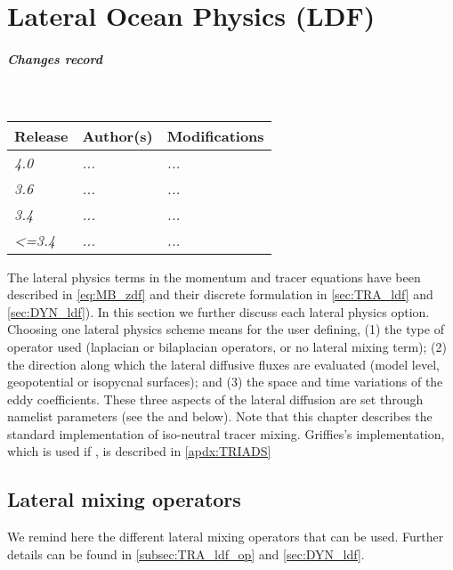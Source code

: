\documentclass[../main/NEMO_manual]{subfiles}
\begin{document}
\chapter{Lateral Ocean Physics (LDF)}
\label{chap:LDF}

\thispagestyle{plain}

\chaptertoc

\paragraph{Changes record} ~\\

{\footnotesize
  \begin{tabularx}{\textwidth}{l||X|X}
    Release & Author(s) & Modifications \\
    \hline
    {\em   4.0} & {\em ...} & {\em ...} \\
    {\em   3.6} & {\em ...} & {\em ...} \\
    {\em   3.4} & {\em ...} & {\em ...} \\
    {\em <=3.4} & {\em ...} & {\em ...}
  \end{tabularx}
}

\clearpage

The lateral physics terms in the momentum and tracer equations have been described in \autoref{eq:MB_zdf} and
their discrete formulation in \autoref{sec:TRA_ldf} and \autoref{sec:DYN_ldf}).
In this section we further discuss each lateral physics option.
Choosing one lateral physics scheme means for the user defining,
(1) the type of operator used (laplacian or bilaplacian operators, or no lateral mixing term);
(2) the direction along which the lateral diffusive fluxes are evaluated
(model level, geopotential or isopycnal surfaces); and
(3) the space and time variations of the eddy coefficients.
These three aspects of the lateral diffusion are set through namelist parameters
(see the  and  below).
Note that this chapter describes the standard implementation of iso-neutral tracer mixing.
Griffies's implementation, which is used if ,
is described in \autoref{apdx:TRIADS}

\section[Lateral mixing operators]{Lateral mixing operators}
\label{sec:LDF_op}
We remind here the different lateral mixing operators that can be used. Further details can be found in \autoref{subsec:TRA_ldf_op} and  \autoref{sec:DYN_ldf}.
\end{document}
